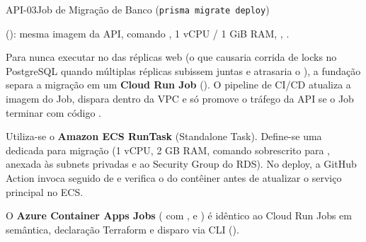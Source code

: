 \begin{pecaarq}{API-03}{Job de Migração de Banco (\texttt{prisma migrate deploy})}{\sgcp~\nativo\enspace\saws~\equivalente\enspace\sazure~\nativo}
\begin{campos}
  \item[Configuração GCP]  (): mesma imagem da API, comando , 1 vCPU / 1 GiB RAM, , .
  \item[Como é hoje (GCP)] Para nunca executar  no  das réplicas web (o que causaria corrida de locks no PostgreSQL quando múltiplas réplicas subissem juntas e atrasaria o ), a fundação separa a migração em um \textbf{Cloud Run Job} (). O pipeline de CI/CD atualiza a imagem do Job, dispara  dentro da VPC e só promove o tráfego da API se o Job terminar com código .
  \item[Equivalente AWS] Utiliza-se o \textbf{Amazon ECS RunTask} (Standalone Task). Define-se uma  dedicada para migração (1 vCPU, 2 GB RAM, comando sobrescrito para , anexada às subnets privadas e ao Security Group do RDS). No deploy, a GitHub Action invoca  seguido de  e verifica o  do contêiner antes de atualizar o serviço principal no ECS.
  \item[Equivalente Azure] O \textbf{Azure Container Apps Jobs} ( com ,  e ) é idêntico ao Cloud Run Jobs em semântica, declaração Terraform e disparo via CLI ().
\end{campos}
\end{pecaarq}

